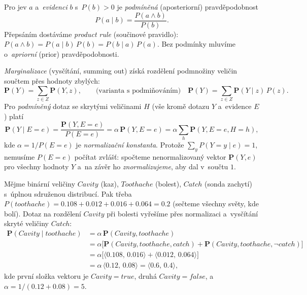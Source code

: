 \begin{definice}
Pro jev $a$ a~\emph{evidenci} $b$ s~$P(b)>0$ je \emph{podmíněná} (aposteriorní) pravděpodobnost
\[ P(a\mid b)=\frac{P(a\wedge b)}{P(b)}. \]
Přepsáním dostáváme \emph{product rule} (součinové pravidlo): $P(a\wedge b)=P(a\mid b)\,P(b)=P(b\mid a)\,P(a)$. Bez podmínky mluvíme o~\emph{apriorní} (prior) pravděpodobnosti.
\end{definice}

\begin{definice}
\emph{Marginalizace} (vysčítání, summing out) získá rozdělení podmnožiny veličin součtem přes hodnoty zbylých:
\[ \mathbf{P}(Y)=\sum_{z\in Z}\mathbf{P}(Y,z), \qquad\text{(varianta s~podmiňováním)}\quad \mathbf{P}(Y)=\sum_{z\in Z}\mathbf{P}(Y\mid z)\,P(z). \]
Pro \emph{podmíněný} dotaz se skrytými veličinami $H$ (vše kromě dotazu $Y$ a~evidence $E$) platí
\[ \mathbf{P}(Y\mid E{=}e)=\frac{\mathbf{P}(Y,E{=}e)}{P(E{=}e)}=\alpha\,\mathbf{P}(Y,E{=}e)=\alpha\sum_{h}\mathbf{P}(Y,E{=}e,H{=}h), \]
kde $\alpha=1/P(E{=}e)$ je \emph{normalizační konstanta}. Protože $\sum_{y}P(Y{=}y\mid e)=1$, nemusíme $P(E{=}e)$ počítat zvlášť: spočteme nenormalizovaný vektor $\mathbf{P}(Y,e)$ pro všechny hodnoty $Y$ a~na závěr ho \emph{znormalizujeme}, aby dal v~součtu $1$.
\end{definice}

\begin{priklad}
Mějme binární veličiny $Cavity$ (kaz), $Toothache$ (bolest), $Catch$ (sonda zachytí) s~úplnou sdruženou distribucí. Pak třeba
$P(toothache)=0.108+0.012+0.016+0.064=0.2$ (sečteme všechny světy, kde bolí). Dotaz na rozdělení $Cavity$ při bolesti vyřešíme přes normalizaci a~vysčítání skryté veličiny $Catch$:
\begin{align*}
\mathbf{P}(Cavity\mid toothache)&=\alpha\,\mathbf{P}(Cavity,toothache)\\
&=\alpha\big[\mathbf{P}(Cavity,toothache,catch)+\mathbf{P}(Cavity,toothache,\neg catch)\big]\\
&=\alpha\big[\langle 0.108,\,0.016\rangle+\langle 0.012,\,0.064\rangle\big]\\
&=\alpha\,\langle 0.12,\,0.08\rangle=\langle 0.6,\,0.4\rangle,
\end{align*}
kde první složka vektoru je $Cavity{=}true$, druhá $Cavity{=}false$, a~$\alpha=1/(0.12+0.08)=5$.
\end{priklad}

